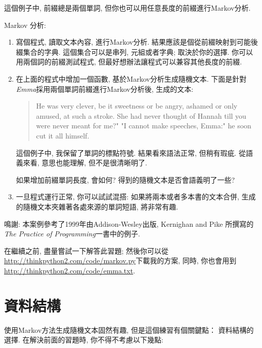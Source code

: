 \documentclass[10pt]{book}
\begin{document}
這個例子中, 前綴總是兩個單詞, 但你也可以用任意長度的前綴進行Markov分析. 

\begin{exercise}

Markov 分析:

\begin{enumerate}

\item 寫個程式, 讀取文本內容, 進行Markov分析. 
結果應該是個從前綴映射到可能後綴集合的字典. 
這個集合可以是串列, 元組或者字典; 取決於你的選擇. 
你可以用兩個詞的前綴測試程式, 但最好想辦法讓程式可以兼容其他長度的前綴. 

\item 在上面的程式中增加一個函數, 基於Markov分析生成隨機文本. 
下面是針對 {\em Emma}採用兩個單詞前綴進行Markov分析後, 生成的文本:

\begin{quote}
He was very clever, be it sweetness or be angry, ashamed or only
amused, at such a stroke. She had never thought of Hannah till you
were never meant for me?" "I cannot make speeches, Emma:" he soon cut
it all himself.
\end{quote}

這個例子中, 我保留了單詞的標點符號. 
結果看來語法正常, 但稍有瑕疵. 
從語義來看, 意思也能理解, 但不是很清晰明了. 

如果增加前綴單詞長度, 會如何? 得到的隨機文本是否會語義明了一些?

\item 一旦程式運行正常, 你可以試試混搭: 
如果將兩本或者多本書的文本合併, 生成的隨機文本夾雜著各處來源的單詞短語, 將非常有趣. 

\end{enumerate}

鳴謝: 本案例參考了1999年由Addison-Wesley出版, Kernighan and Pike
所撰寫的{\em The Practice of Programming}一書中的例子. 
\end{exercise}

在繼續之前, 盡量嘗試一下解答此習題; 然後你可以從 
\url{http://thinkpython2.com/code/markov.py}下載我的方案, 同時, 
你也會用到\url{http://thinkpython2.com/code/emma.txt}.


\section{資料結構}

使用Markov方法生成隨機文本固然有趣, 但是這個練習有個關鍵點：
資料結構的選擇. 在解決前面的習題時, 你不得不考慮以下幾點:
\end{document}
